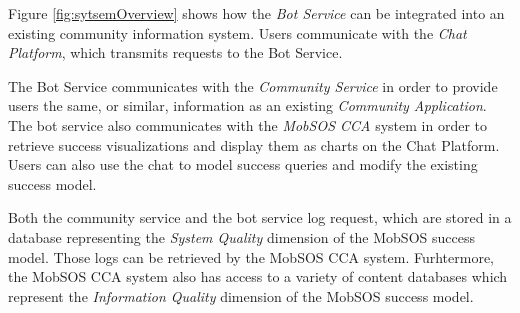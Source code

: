 Figure \ref{fig:sytsemOverview} shows how the \emph{Bot Service} can be integrated into an existing community information system. Users communicate with the \emph{Chat Platform}, which transmits requests to the Bot Service.

The Bot Service communicates with the \emph{Community Service} in order to provide users the same, or similar, information as an existing \emph{Community Application}. The bot service also communicates with the \emph{MobSOS CCA} system in order to retrieve success visualizations and display them as charts on the Chat Platform. Users can also use the chat to model success queries and modify the existing success model.

Both the community service and the bot service log request, which are stored in a database representing the \emph{System Quality} dimension of the MobSOS success model. Those logs can be retrieved by the MobSOS CCA system. Furhtermore, the MobSOS CCA system also has access to a variety of content databases which represent the \emph{Information Quality} dimension of the MobSOS success model.